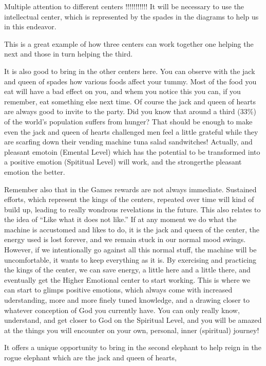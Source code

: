 \documentclass[12pt,letterpaper]{book}
\begin{document}
Multiple attention to different centers
!!!!!!!!!!!
It will be necessary to use the intellectual center, which is represented by the spades in the diagrams to help us in this endeavor.

This is a great example of how three centers can work together one helping the next and those in turn helping the third.

It is also good to bring in the other centers here. You can observe with the jack and queen of spades how various foods affect your tummy. Most of the food you eat will have a bad effect on you, and whem you notice this you can, if you remember, eat something else next time. Of course the jack and queen of hearts are always good to invite to the party. Did you know that around a third (33\%) of the world's population suffers from hunger? That should be enough to make even the jack and queen of hearts challenged men feel a little grateful while they are scarfing down their vending machine tuna salad sandwitches! Actually, and pleasant emotoin (Emental Level) which has the potential to be transformed into a positive emotion (Spititual Level) will work, and the strongerthe pleasant emotion the better.

Remember also that in the Games rewards are not always immediate. Sustained efforts, which represent the kings of the centers, repeated over time will kind of build up, leading to really wondrous revelations in the future. This also relates to the idea of ``Like what it does not like.'' If at any moment we do what the machine is accustomed and likes to do, it is the jack and queen of the center, the energy used is lost forever, and we remain stuck in our normal mood swings. However, if we intentionally go against all this normal stuff, the machine will be uncomfortable, it wants to keep everything as it is.
By exercising and practicing the kings of the center, we can save energy, a little here and a little there, and eventually get the Higher Emotional center to start working. This is where we can start to glimps positive emotions, which always come with increased uderstanding, more and more finely tuned knowledge, and a drawing closer to whatever conception of God you currently have. You can only really know, understand, and get closer to God on the Spiritual Level, and you will be amazed at the things you will encounter on your own, personal, inner (spiritual) journey! 

It offers a unique opportunity to bring in the second elephant to help reign in the rogue elephant which are the jack and queen of hearts,
\end{document}
